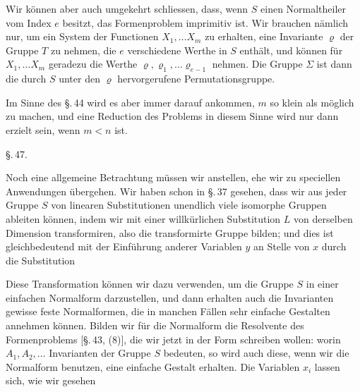 

Wir können aber auch umgekehrt schliessen, dass, wenn $S$ einen Normaltheiler vom Index $e$ besitzt, das Formenproblem imprimitiv ist. Wir brauchen nämlich nur, um ein System der Functionen $X_1, \ldots X_m$ zu erhalten, eine Invariante $\varrho$ der Gruppe $T$ zu nehmen, die $e$ verschiedene Werthe in $S$ enthält, und können für $X_1, \ldots X_m$ geradezu die Werthe $\varrho, \varrho_1, \ldots \varrho_{e-1}$ nehmen. Die Gruppe $\Sigma$ ist dann die durch $S$ unter den $\varrho$ hervorgerufene Permutationsgruppe.

Im Sinne des \S.\,44 wird es aber immer darauf ankommen, $m$ so klein als möglich zu machen, und eine Reduction des Problems in diesem Sinne wird nur dann erzielt sein, wenn $m < n$ ist.

\begin{center}
\S.\,47.

\end{center}

Noch eine allgemeine Betrachtung müssen wir anstellen, ehe wir zu speciellen Anwendungen übergehen. Wir haben schon in \S.\,37 gesehen, dass wir aus jeder Gruppe $S$ von linearen Substitutionen unendlich viele isomorphe Gruppen ableiten können, indem wir mit einer willkürlichen Substitution $L$ von derselben Dimension transformiren, also die transformirte Gruppe
bilden; und dies ist gleichbedeutend mit der Einführung anderer Variablen $y$ an Stelle von $x$ durch die Substitution

Diese Transformation können wir dazu verwenden, um die Gruppe $S$ in einer einfachen Normalform darzustellen, und dann erhalten auch die Invarianten gewisse feste Normalformen, die in manchen Fällen sehr einfache Gestalten annehmen können. Bilden wir für die Normalform die Resolvente des Formenproblems [\S.\,43, (8)], die wir jetzt in der Form schreiben wollen:
worin $A_1, A_2, \ldots$ Invarianten der Gruppe $S$ bedeuten, so wird auch diese, wenn wir die Normalform benutzen, eine einfache Gestalt erhalten. Die Variablen $x_i$ lassen sich, wie wir gesehen
